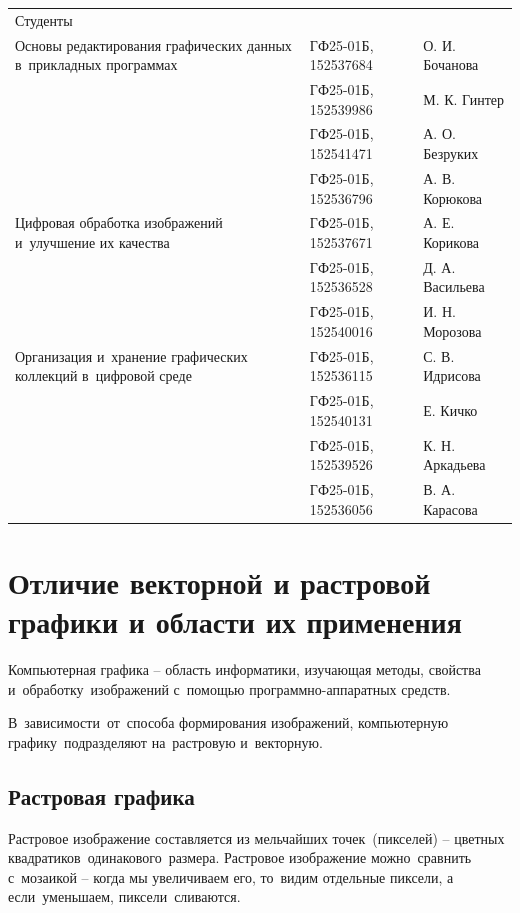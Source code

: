 \documentclass{ou}
\begin{document}
\begin{flushleft}
\doublespacing
\begin{tabularx}{\textwidth}{@{} p{} l l @{}}
Студенты     &                     &         \\
\multirow{-2.27}{\hsize}{\singlespacing Основы редактирования графических данных в~прикладных программах}
             & ГФ25-01Б, 152537684 & О. И. Бочанова\\
             & ГФ25-01Б, 152539986 & М. К. Гинтер\\
             & ГФ25-01Б, 152541471 & А. О. Безруких\\
             & ГФ25-01Б, 152536796 & А. В. Корюкова\\
\multirow{-2.27}{\hsize}{\singlespacing Цифровая обработка изображений и~улучшение их качества}
             & ГФ25-01Б, 152537671 & А. Е. Корикова\\
             & ГФ25-01Б, 152536528 & Д. А. Васильева\\
             & ГФ25-01Б, 152540016 & И. Н. Морозова\\
\multirow{-2.27}{\hsize}{\singlespacing Организация и~хранение графических коллекций в~цифровой среде}
             & ГФ25-01Б, 152536115 & С. В. Идрисова\\
             & ГФ25-01Б, 152540131 & Е. Кичко\\
             & ГФ25-01Б, 152539526 & К. Н. Аркадьева\\
             & ГФ25-01Б, 152536056 & В. А. Карасова\\
\end{tabularx}
\end{flushleft}
\newpage
\tableofcontents
\newpage
\onehalfspacing
\section{Отличие векторной и растровой графики и области их применения}
Компьютерная графика -- область информатики, изучающая методы, свойства и~обработку~изображений с~помощью программно-аппаратных средств.

В~зависимости~от~способа формирования изображений, компьютерную графику~подразделяют на~растровую и~векторную.
 \subsection{Растровая графика}
Растровое изображение составляется из мельчайших точек~(пикселей) -- цветных квадратиков~одинакового~размера. Растровое изображение можно~сравнить с~мозаикой -- когда мы увеличиваем его, то~видим отдельные пиксели, а если~уменьшаем, пиксели~сливаются.
\end{document}
